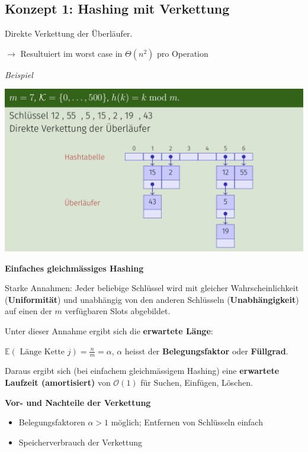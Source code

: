 \begin{sectionbox}
\subsection{Konzept 1: Hashing mit Verkettung}\par\smallskip
Direkte Verkettung der Überläufer.\par
$\rightarrow$ Resultuiert im worst case in $\Theta(n^{2})$ pro Operation\par\smallskip

\textit{Beispiel}\par
\begin{center}
    \includegraphics[width = \columnwidth]{../img/hashVerkettung.png}
\end{center}\smallskip
\end{sectionbox}
\vspace{-4pt}
\begin{sectionbox}
\textbf{Einfaches gleichmässiges Hashing}\par
Starke Annahmen: Jeder beliebige Schlüssel wird mit gleicher Wahrscheinlichkeit (\textbf{Uniformität}) und unabhängig von den anderen Schlüsseln (\textbf{Unabhängigkeit}) auf einen der $m$ verfügbaren Slots abgebildet.\par\smallskip
Unter dieser Annahme ergibt sich die \textbf{erwartete Länge}:\par $\mathbb{E}(\text { Länge Kette } j)=\frac{n}{m}=\alpha$, $\alpha$ heisst der \textbf{Belegungsfaktor} oder \textbf{Füllgrad}.\par\smallskip
Daraus ergibt sich (bei einfachem gleichmässigem Hashing) eine \textbf{erwartete Laufzeit (amortisiert)} von $\mathcal{O}(1)$ für Suchen, Einfügen, Löschen.\par\smallskip
\textbf{Vor- und Nachteile der Verkettung}\par
\begin{itemize}
    \item Belegungsfaktoren $\alpha > 1$ möglich; Entfernen von Schlüsseln einfach
    \item Speicherverbrauch der Verkettung
\end{itemize}\smallskip

\end{sectionbox}
